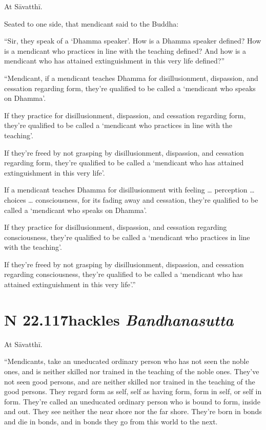\documentclass[12pt,openany]{book}%
\newcommand*{\suttatitleacronym}[1]{\smaller[2]{#1}\vspace*{.3em}}
\newcommand*{\suttatitletranslation}[1]{\linebreak{#1}}
\newcommand*{\suttatitleroot}[1]{\linebreak\smaller[2]\itshape{#1}}
\newcommand*{\tocacronym}[1]{\hspace*{-3.3em}{#1}\quad}
\newcommand*{\toctranslation}[1]{#1}
\newcommand*{\tocroot}[1]{(\textit{#1})}
\begin{document}
At \textsanskrit{Sāvatthī}. 

Seated to one side, that mendicant said to the Buddha: 

“Sir, they speak of a ‘Dhamma speaker’. How is a Dhamma speaker defined? How is a mendicant who practices in line with the teaching defined? And how is a mendicant who has attained extinguishment in this very life defined?” 

“Mendicant, if a mendicant teaches Dhamma for disillusionment, dispassion, and cessation regarding form, they’re qualified to be called a ‘mendicant who speaks on Dhamma’. 

If they practice for disillusionment, dispassion, and cessation regarding form, they’re qualified to be called a ‘mendicant who practices in line with the teaching’. 

If they’re freed by not grasping by disillusionment, dispassion, and cessation regarding form, they’re qualified to be called a ‘mendicant who has attained extinguishment in this very life’. 

If a mendicant teaches Dhamma for disillusionment with feeling … perception … choices … consciousness, for its fading away and cessation, they’re qualified to be called a ‘mendicant who speaks on Dhamma’. 

If they practice for disillusionment, dispassion, and cessation regarding consciousness, they’re qualified to be called a ‘mendicant who practices in line with the teaching’. 

If they’re freed by not grasping by disillusionment, dispassion, and cessation regarding consciousness, they’re qualified to be called a ‘mendicant who has attained extinguishment in this very life’.” 

%
\section*{{\suttatitleacronym SN 22.117}{\suttatitletranslation Shackles }{\suttatitleroot Bandhanasutta}}
\addcontentsline{toc}{section}{\tocacronym{SN 22.117} \toctranslation{Shackles } \tocroot{Bandhanasutta}}

At \textsanskrit{Sāvatthī}. 

“Mendicants, take an uneducated ordinary person who has not seen the noble ones, and is neither skilled nor trained in the teaching of the noble ones. They’ve not seen good persons, and are neither skilled nor trained in the teaching of the good persons. They regard form as self, self as having form, form in self, or self in form. They’re called an uneducated ordinary person who is bound to form, inside and out. They see neither the near shore nor the far shore. They’re born in bonds and die in bonds, and in bonds they go from this world to the next. 
\end{document}
